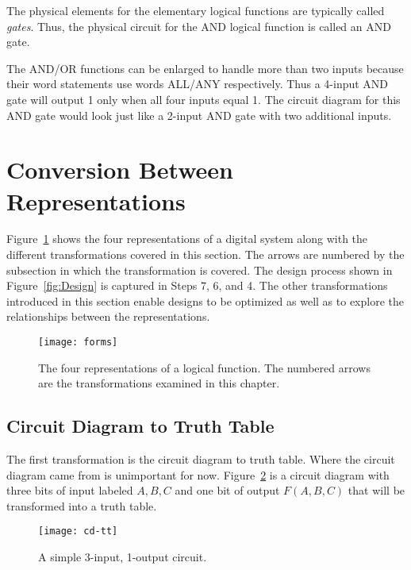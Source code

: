 The physical elements for the elementary logical functions are
typically called \textit{gates}.   Thus, the physical circuit for 
the AND logical function is called an AND gate.

The AND/OR functions can be enlarged to handle more than
two inputs because their word statements use words ALL/ANY
respectively.  Thus a 4-input AND gate will output 1
only when all four inputs equal 1.  The circuit diagram for 
this AND gate would look just like a 2-input AND gate with
two additional inputs.

\section{Conversion Between Representations}
Figure~\ref{fig:representationsForms} shows the four representations of a digital system
along with the different transformations covered in this section.  
The arrows are numbered by the subsection in which the transformation is
covered.  The design process shown in Figure~\ref{fig:Design} is captured
in Steps 7, 6, and 4.  The other transformations introduced in this 
section enable designs to be optimized as well as to explore 
the relationships between the representations.

\begin{figure}[ht]
\texttt{[image: forms]}
\caption{The four representations of a logical function.  The
numbered arrows are the transformations examined in this chapter.}
\label{fig:representationsForms}
\end{figure}

\subsection{Circuit Diagram to Truth Table}

The first transformation is the circuit diagram to truth table.  
Where the circuit diagram came from is unimportant for now.
Figure~\ref{fig:representationsCD-TT} is a circuit diagram with three bits of 
input labeled $A,B,C$ and one bit of output $F(A,B,C)$ that will
be transformed into a truth table.

\begin{figure}[ht]
\texttt{[image: cd-tt]}
\caption{A simple 3-input, 1-output circuit.}
\label{fig:representationsCD-TT}
\end{figure}

